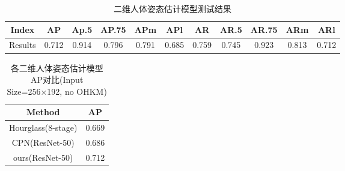 \begin{table}[h]
    \caption{\label{tab:t1}二维人体姿态估计模型测试结果}
    \centering
    \begin{tabular}{c c c c c c c c c c c}
        \toprule
        Index	   & AP	    & Ap.5	    & AP.75	    & APm	    & APl	    & AR	    & AR.5	    & AR.75	    & ARm	    & ARl   \\
        \midrule
        Results   & 0.712	& 0.914	    & 0.796     & 0.791	    & 0.685	    & 0.759	    & 0.745	    & 0.923	    & 0.813	    & 0.712   \\
        \bottomrule
    \end{tabular}
\end{table}

\begin{table}[h]
    \caption{\label{tab:t2}各二维人体姿态估计模型AP对比(Input Size=256×192, no OHKM)}
    \centering
    \begin{tabular}{c c}
        \toprule
        Method	   & AP	 \\
        \midrule
        Hourglass(8-stage)	& 0.669 \\
        CPN(ResNet-50)	    & 0.686 \\
        ours(ResNet-50)	    & 0.712 \\
        \bottomrule
    \end{tabular}
\end{table}